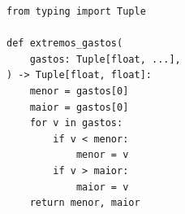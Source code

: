 \ifmostrarGabarito
\begin{verbatim}
from typing import Tuple

def extremos_gastos(
    gastos: Tuple[float, ...],
) -> Tuple[float, float]:
    menor = gastos[0]
    maior = gastos[0]
    for v in gastos:
        if v < menor:
            menor = v
        if v > maior:
            maior = v
    return menor, maior
\end{verbatim}

\fi
